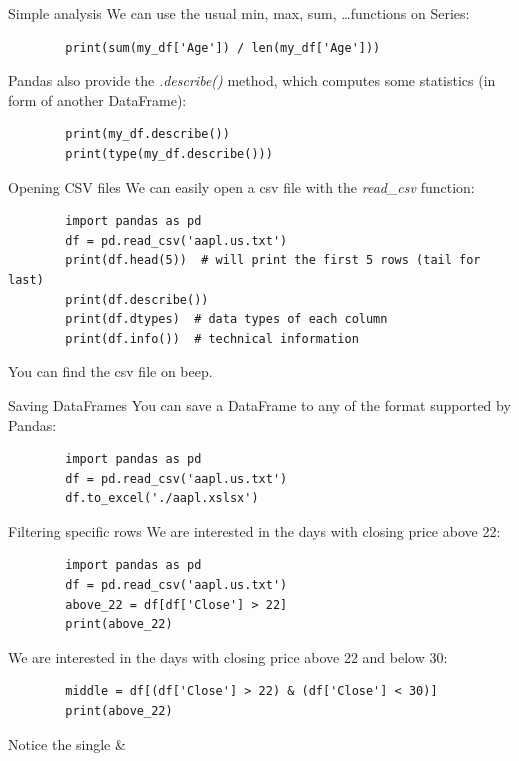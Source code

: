 \documentclass[aspectratio=169,]{beamer}
\begin{document}
\begin{frame}[fragile]{Simple analysis}
    We can use the usual min, max, sum, \ldots functions on Series:
    \begin{verbatim}
        print(sum(my_df['Age']) / len(my_df['Age']))
    \end{verbatim}

    Pandas also provide the \emph{.describe()} method, which computes some statistics (in form of another DataFrame):
    \begin{verbatim}
        print(my_df.describe())
        print(type(my_df.describe()))
    \end{verbatim}
\end{frame}

\begin{frame}[fragile]{Opening CSV files}
    We can easily open a csv file with the \emph{read\_csv} function:
    \begin{verbatim}
        import pandas as pd
        df = pd.read_csv('aapl.us.txt')
        print(df.head(5))  # will print the first 5 rows (tail for last)
        print(df.describe())
        print(df.dtypes)  # data types of each column
        print(df.info())  # technical information
    \end{verbatim}

    You can find the csv file on beep.
\end{frame}

\begin{frame}[fragile]{Saving DataFrames}
    You can save a DataFrame to any of the format supported by Pandas:
    \begin{verbatim}
        import pandas as pd
        df = pd.read_csv('aapl.us.txt')
        df.to_excel('./aapl.xslsx')
    \end{verbatim}
\end{frame}

\begin{frame}[fragile]{Filtering specific rows}
    We are interested in the days with closing price above 22:
    \begin{verbatim}
        import pandas as pd
        df = pd.read_csv('aapl.us.txt')
        above_22 = df[df['Close'] > 22]
        print(above_22)
    \end{verbatim}

    We are interested in the days with closing price above 22 and below 30:
    \begin{verbatim}
        middle = df[(df['Close'] > 22) & (df['Close'] < 30)]
        print(above_22)
    \end{verbatim}

    Notice the single \&
\end{frame}
\end{document}
